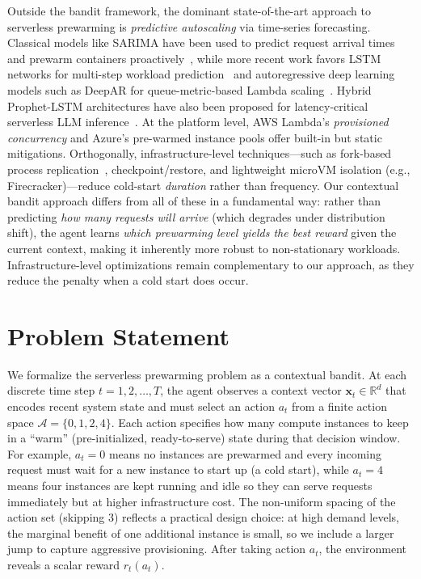 \documentclass[11pt]{article}
\begin{document}
Outside the bandit framework, the dominant state-of-the-art approach to serverless prewarming is \textit{predictive autoscaling} via time-series forecasting. Classical models like SARIMA have been used to predict request arrival times and prewarm containers proactively~\cite{yemets2024}, while more recent work favors LSTM networks for multi-step workload prediction~\cite{suleiman2024} and autoregressive deep learning models such as DeepAR for queue-metric-based Lambda scaling~\cite{kyrychenko2025}. Hybrid Prophet-LSTM architectures have also been proposed for latency-critical serverless LLM inference~\cite{flashserve2025}. At the platform level, AWS Lambda's \textit{provisioned concurrency} and Azure's pre-warmed instance pools offer built-in but static mitigations. Orthogonally, infrastructure-level techniques---such as fork-based process replication~\cite{chai2025}, checkpoint/restore, and lightweight microVM isolation (e.g., Firecracker)---reduce cold-start \textit{duration} rather than frequency. Our contextual bandit approach differs from all of these in a fundamental way: rather than predicting \textit{how many requests will arrive} (which degrades under distribution shift), the agent learns \textit{which prewarming level yields the best reward} given the current context, making it inherently more robust to non-stationary workloads. Infrastructure-level optimizations remain complementary to our approach, as they reduce the penalty when a cold start does occur.

\section{Problem Statement}

We formalize the serverless prewarming problem as a contextual bandit. At each discrete time step $t = 1, 2, \ldots, T$, the agent observes a context vector $\mathbf{x}_t \in \mathbb{R}^d$ that encodes recent system state and must select an action $a_t$ from a finite action space $\mathcal{A} = \{0, 1, 2, 4\}$. Each action specifies how many compute instances to keep in a ``warm'' (pre-initialized, ready-to-serve) state during that decision window. For example, $a_t = 0$ means no instances are prewarmed and every incoming request must wait for a new instance to start up (a cold start), while $a_t = 4$ means four instances are kept running and idle so they can serve requests immediately but at higher infrastructure cost. The non-uniform spacing of the action set (skipping 3) reflects a practical design choice: at high demand levels, the marginal benefit of one additional instance is small, so we include a larger jump to capture aggressive provisioning. After taking action $a_t$, the environment reveals a scalar reward $r_t(a_t)$.
\end{document}
